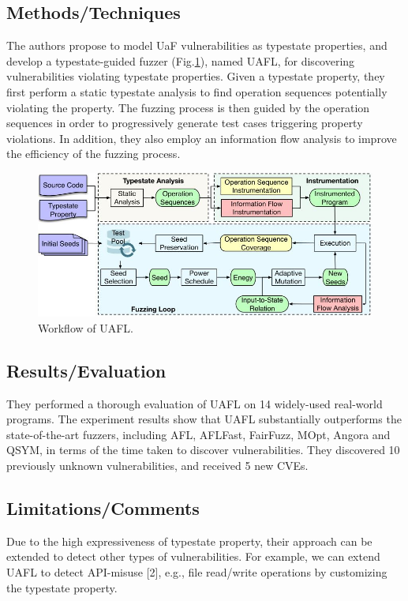 \subsection{Methods/Techniques}
The authors propose to model UaF vulnerabilities as typestate properties, and develop a typestate-guided fuzzer (Fig.\ref{fig:uafl}), named UAFL, for discovering vulnerabilities violating typestate properties. Given a typestate property, they first perform a static typestate analysis to find operation sequences potentially violating the property. The fuzzing process is then guided by the operation sequences in order to progressively generate test cases triggering property violations. In addition, they also employ an information flow analysis to improve the efficiency of the fuzzing process. 
\begin{figure}[h]
    \centering
    \includegraphics[width=\linewidth]{uafl.jpg} %
    \caption{Workflow of UAFL.}	
    \label{fig:uafl}
\end{figure}
\subsection{Results/Evaluation}
They performed a thorough evaluation of UAFL on 14 widely-used real-world programs. The experiment results show that UAFL substantially outperforms the state-of-the-art fuzzers, including AFL, AFLFast, FairFuzz, MOpt, Angora and QSYM, in terms of the time taken to discover vulnerabilities. They discovered 10 previously unknown vulnerabilities, and received 5 new CVEs.
\subsection{Limitations/Comments}
 Due to the high expressiveness of typestate property, their approach can be extended to detect other types of vulnerabilities. For example, we can extend UAFL to detect API-misuse [2], e.g., file read/write operations by customizing the typestate property. 
\newpage


